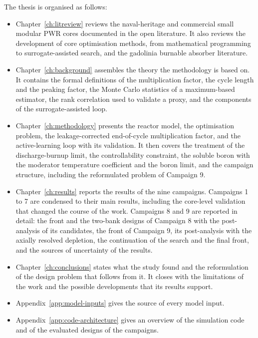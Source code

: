 The thesis is organised as follows:

\begin{itemize}
  \item Chapter~\ref{ch:litreview} reviews the naval-heritage and
        commercial small modular PWR cores documented in the open
        literature. It also reviews the development of core
        optimisation methods, from mathematical programming to
        surrogate-assisted search, and the gadolinia burnable absorber
        literature.

  \item Chapter~\ref{ch:background} assembles the theory the
        methodology is based on. It contains the formal definitions of the
        multiplication factor, the cycle length and the peaking factor,
        the Monte Carlo statistics of a maximum-based estimator, the
        rank correlation used to validate a proxy, and the components
        of the surrogate-assisted loop.

  \item Chapter~\ref{ch:methodology} presents the reactor model, the
        optimisation problem, the leakage-corrected end-of-cycle multiplication factor,
        and the active-learning loop with its validation. It then
        covers the treatment of the discharge-burnup limit, the
        controllability constraint, the soluble boron with the moderator
        temperature coefficient and the boron limit, and the campaign
        structure, including the reformulated problem of Campaign 9.

  \item Chapter~\ref{ch:results} reports the results of the nine
        campaigns. Campaigns 1 to 7 are condensed to their main results,
        including the core-level validation that changed the course of
        the work. Campaigns 8 and 9 are reported in detail: the front and
        the two-bank designs of Campaign 8 with the post-analysis of its
        candidates, the front of Campaign 9, its post-analysis with the
        axially resolved depletion, the continuation of the search and
        the final front, and the sources of uncertainty of the results.

  \item Chapter~\ref{ch:conclusions} states what the study found and
        the reformulation of the design problem that follows from it. It
        closes with the limitations of the work and the possible
        developments that its results support.

  \item Appendix~\ref{app:model-inputs} gives the source of every
        model input.

  \item Appendix~\ref{app:code-architecture} gives an overview of the
        simulation code and of the evaluated designs of the campaigns.
\end{itemize}
